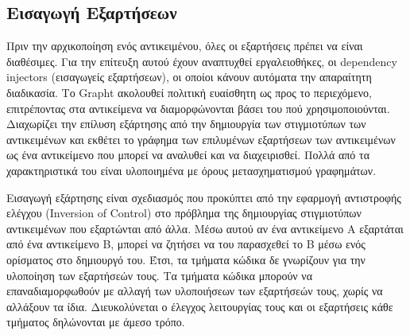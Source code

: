 \subsection{Εισαγωγή Εξαρτήσεων}
Πριν την αρχικοποίηση ενός αντικειμένου, όλες οι εξαρτήσεις πρέπει να είναι διαθέσιμες. Για την επίτευξη αυτού έχουν αναπτυχθεί εργαλειοθήκες, οι {\en dependency injectors} (εισαγωγείς εξαρτήσεων), οι οποίοι κάνουν αυτόματα την απαραίτητη διαδικασία. Το {\en Grapht} ακολουθεί πολιτική ευαίσθητη ως προς το περιεχόμενο, επιτρέποντας στα αντικείμενα να διαμορφώνονται βάσει του πού χρησιμοποιούνται. Διαχωρίζει την επίλυση εξάρτησης από την δημιουργία των στιγμιοτύπων των αντι\-κειμένων και εκθέτει το γράφημα των επιλυμένων εξαρτήσεων των αντικειμένων ως ένα αντικείμενο που μπορεί να αναλυθεί και να διαχειρισθεί. Πολλά από τα χαρακτηριστικά του είναι υλοποιημένα με όρους μετασχηματισμού γραφημάτων. \par
Εισαγωγή εξάρτησης είναι σχεδιασμός που προκύπτει από την εφαρμογή αντι\-στροφής ελέγχου {\en (Inversion of Control)} στο πρόβλημα της δημιουργίας στιγμιοτύπων αντικειμένων που εξαρτώνται από άλλα. Μέσω αυτού αν ένα αντικείμενο Α εξαρτάται από ένα αντικείμενο Β, μπορεί να ζητήσει να του παρασχεθεί το Β μέσω ενός ορίσματος στο δημιουργό του. Έτσι, τα τμήματα κώδικα δε γνωρίζουν για την υλοποίηση των εξαρτήσεών τους. Τα τμήματα κώδικα μπορούν να επαναδιαμορφωθούν με αλλαγή των υλοποιήσεων των εξαρτήσεών τους, χωρίς να αλλάξουν τα ίδια. Διευκολύνεται ο έλεγχος λειτουργίας τους και οι εξαρτήσεις κάθε τμήματος δηλώνονται με άμεσο τρόπο. 